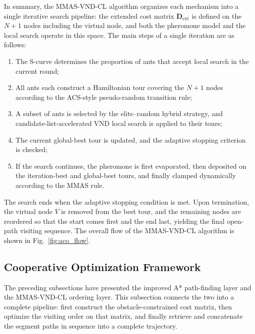 \documentclass[pdflatex,sn-basic,Numbered]{sn-jnl}
\begin{document}
In summary, the MMAS-VND-CL algorithm organizes each mechanism into a single iterative search pipeline: the extended cost matrix $\mathbf{D}_{\mathrm{ext}}$ is defined on the $N+1$ nodes including the virtual node, and both the pheromone model and the local search operate in this space. The main steps of a single iteration are as follows:
\begin{enumerate}
\item The S-curve determines the proportion of ants that accept local search in the current round;
\item All ants each construct a Hamiltonian tour covering the $N+1$ nodes according to the ACS-style pseudo-random transition rule;
\item A subset of ants is selected by the elite--random hybrid strategy, and candidate-list-accelerated VND local search is applied to their tours;
\item The current global-best tour is updated, and the adaptive stopping criterion is checked;
\item If the search continues, the pheromone is first evaporated, then deposited on the iteration-best and global-best tours, and finally clamped dynamically according to the MMAS rule.
\end{enumerate}
The search ends when the adaptive stopping condition is met. Upon termination, the virtual node $V$ is removed from the best tour, and the remaining nodes are reordered so that the start comes first and the end last, yielding the final open-path visiting sequence. The overall flow of the MMAS-VND-CL algorithm is shown in Fig.~\ref{fig:aco_flow}.

\subsection{Cooperative Optimization Framework}
\label{subsec:coop}

The preceding subsections have presented the improved A* path-finding layer and the MMAS-VND-CL ordering layer. This subsection connects the two into a complete pipeline: first construct the obstacle-constrained cost matrix, then optimize the visiting order on that matrix, and finally retrieve and concatenate the segment paths in sequence into a complete trajectory.
\end{document}
